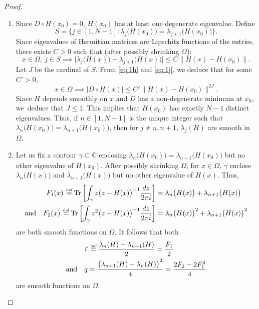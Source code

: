 \documentclass[10pt]{amsart}
\let\sep:
\theoremstyle{definition}
\DeclareMathOperator{\Tr}{Tr}
\newcommand{\C}{\mathbb{C}}
\newcommand{\de}{\,\mathrel{\stackrel{\makebox[0pt]{\mbox{\normalfont\tiny def}}}{=}}}
\begin{document}
\begin{proof}
\begin{enumerate}
\item
Since $D \circ H(x_0) = 0$, $H(x_0)$ has at least one degenerate eigenvalue. Define\vspace*{-3pt}
\begin{equation*}
S = \bigl\{ j \in [1,N-1]\sep \lambda_j\bigl( H(x_0) \bigr) = \lambda_{j+1}\bigl( H(x_0) \bigr) \bigr\}.
\end{equation*}
Since eigenvalues of Hermitian matrices are Lipschitz functions of the entries, there exists $C > 0$ such that (after possibly shrinking $\Omega$):
\begin{equation}\label{eq:1j}
x\in \Omega, \ j \in S \implies
\big|\lambda_j \bigl( H(x) \bigr) - \lambda_{j+1} \bigl( H(x) \bigr)\big| \leq C \big\| H(x)-H(x_0)\big\|.
\end{equation}
Let $J$ be the cardinal of $S$. From \eqref{eq:1h} and \eqref{eq:1j}, we deduce that for some $C' > 0$,\vspace*{-3pt}
\begin{equation*}
x\in \Omega \implies \big| D \circ H(x) \big| \leq C' \big\| H(x)-H(x_0)\big\|^{2J}.
\end{equation*}
Since $H$ depends smoothly on $x$ and $D$ has a non-degenerate minimum at $x_0$, we~deduce that $J \leq 1$. This implies that $H(x_0)$ has exactly $N-1$ distinct eigenvalues. Thus, if $n \in [1,N-1]$ is the unique integer such that $\lambda_n\bigl( H(x_0) \bigr) = \lambda_{n+1}\bigl( H(x_0)\bigr)$, then for $j \neq n, n+1$, $\lambda_j(H)$ are smooth in $\Omega$.

\item
Let us fix a contour $\gamma \subset \C$ enclosing $\lambda_n\bigl(H(x_0)\bigr) = \lambda_{n+1}\bigl(H(x_0)\bigr)$ but no other eigenvalue of $H(x_0)$. After possibly shrinking $\Omega$, for $x \in \Omega$, $\gamma$ enclose $\lambda_n\bigl(H(x)\bigr)$ and $\lambda_{n+1}\bigl(H(x)\bigr)$ but no other eigenvalue of $H(x)$. Thus,\vspace*{-3pt}
\begin{equation}\label{eq:0a}
\begin{split}
F_1(x) \de \Tr \left[ \int_\gamma z \bigl(z-H(x)\bigr)^{-1} \dfrac{dz}{2\pi i} \right] &= \lambda_n\bigl(H(x)\bigr) + \lambda_{n+1}\bigl(H(x)\bigr)
\\
\text{and} \quad F_2(x) \de \Tr \left[ \int_\gamma z^2 \bigl(z-H(x)\bigr)^{-1} \dfrac{dz}{2\pi i} \right] &= \lambda_n\bigl(H(x)\bigr)^2 + \lambda_{n+1}\bigl(H(x)\bigr)^2
\end{split}
\end{equation}
are both smooth functions on $\Omega$. It follows that both
\begin{equation}\label{eq:1m}
\begin{split}
\ell &\de \dfrac{\lambda_n(H) + \lambda_{n+1}(H)}{2} = \dfrac{F_1}{2} \\
\text{and} \quad q &= \dfrac{\bigl(\lambda_{n+1}(H) - \lambda_n(H)\bigr)^2}{4} = \dfrac{2F_2-2F_1^2}{4}
\end{split}
\end{equation}
are smooth functions on $\Omega$.


\end{enumerate}
\end{proof}
\end{document}
